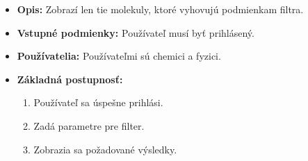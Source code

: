 \documentclass[12pt,a4paper]{article}
\begin{document}
\begin{enumerate}[label={[UC-\arabic*]}]
	\begin{itemize}
		\item{\bf Opis: } Zobrazí len tie molekuly, ktoré vyhovujú podmienkam filtra.
		\item{\bf Vstupné podmienky: } Používateľ musí byť prihlásený.
		\item{\bf Používatelia: } Používateľmi sú chemici a fyzici.
		\item{\bf Základná postupnosť: }
		\begin{enumerate}[label={\arabic*.}]
			\item Používateľ sa úspešne prihlási.
			\item Zadá parametre pre filter.
			\item Zobrazia sa požadované výsledky.
		\end{enumerate}
	\end{itemize}

\pagebreak


\end{enumerate}
\end{document}
